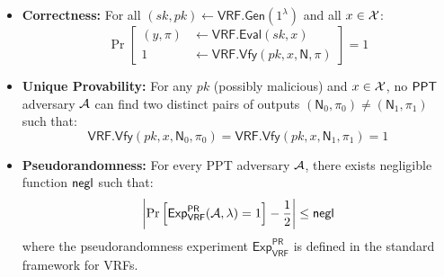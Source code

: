 \begin{itemize}
    \item \textbf{Correctness:} For all $(sk, pk) \gets \mathsf{VRF.Gen}(1^\lambda)$ and all $x \in \mathcal{X}$:
    \[
    \Pr\left[\begin{aligned}
        (y, \pi) &\gets \mathsf{VRF.Eval}(sk, x) \\
        1 &\gets \mathsf{VRF.Vfy}(pk, x, \textsf{N}, \pi)
    \end{aligned}\right] = 1
    \]

    \item \textbf{Unique Provability:} For any $pk$ (possibly malicious) and $x \in \mathcal{X}$, no $\mathsf{PPT}$ adversary $\mathcal{A}$ can find two distinct pairs of outputs $(\textsf{N}_0, \pi_0) \neq (\textsf{N}_1, \pi_1)$ such that:
    \[
    \mathsf{VRF.Vfy}(pk, x, \textsf{N}_0, \pi_0) = \mathsf{VRF.Vfy}(pk, x, \textsf{N}_1, \pi_1) = 1
    \]

    \item \textbf{Pseudorandomness:} For every PPT adversary $\mathcal{A}$, there exists negligible function $\mathsf{negl}$ such that:
    \[
    \left|\Pr\left[\mathsf{Exp}_{\mathsf{VRF}}^{\mathsf{PR}}(\mathcal{A}, \lambda) = 1\right] - \frac{1}{2}\right| \leq \mathsf{negl}
    \]
    where the pseudorandomness experiment $\mathsf{Exp}_{\mathsf{VRF}}^{\mathsf{PR}}$ is defined in the standard framework for VRFs.
\end{itemize}
